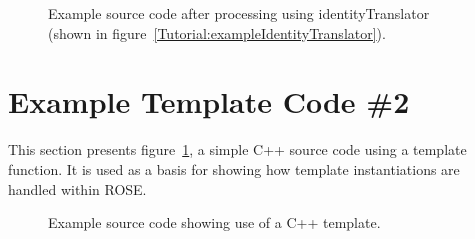 \begin{figure}[!h]
{\indent
{\mySmallFontSize


\begin{latexonly}
   
\end{latexonly}

\begin{htmlonly}
   
\end{htmlonly}

}
}
\caption{Example source code after processing using identityTranslator 
(shown in figure~\ref{Tutorial:exampleIdentityTranslator}).}
\label{Tutorial:exampleTemplate1}
\end{figure}



\section{Example Template Code \#2}
     
   This section presents figure~\ref{Tutorial:exampleTemplate1}, a simple 
C++ source code using a template function. It is used as a basis for showing how 
template instantiations are handled within ROSE.

\begin{figure}[!h]
{\indent
{\mySmallFontSize


\begin{latexonly}
   
\end{latexonly}

\begin{htmlonly}
   
\end{htmlonly}

}
}
\caption{Example source code showing use of a C++ template.}
\label{Tutorial:exampleTemplate2}
\end{figure}

